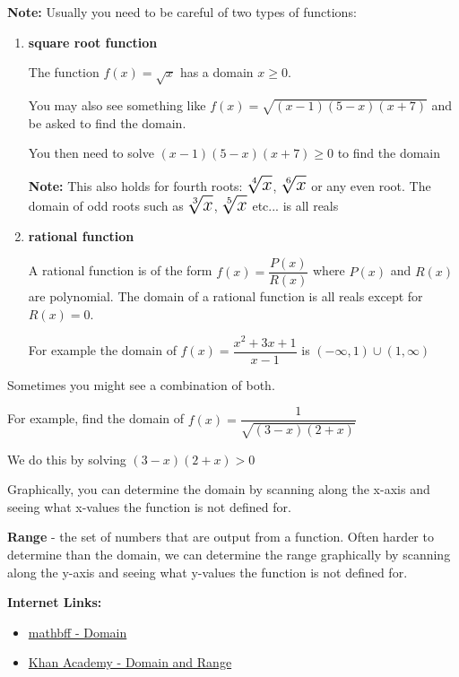 \documentclass[12pt]{article}
\newenvironment{myindentpar}[1]%
     {\begin{list}{}%
             {\setlength{\leftmargin}{#1}}%
             \item[]%
     }
     {\end{list}}
\begin{document}
\begin{myindentpar}{1cm}
\textbf{Note:} Usually you need to be careful of two types of functions: 

\begin{enumerate}
\item \textbf{square root function} 

The function $f(x) = \sqrt{x}$ has a domain $x \geq 0$. 

You may also see something like $f(x) = \sqrt{(x-1)(5-x)(x+7)}$ and be asked to find the domain. 

You then need to solve $(x-1)(5-x)(x+7) \geq 0$ to find the domain

\textbf{Note:} This also holds for fourth roots: $\mathlarger{\mathlarger{\mathlarger{\sqrt[4]{x}}}}$, $\mathlarger{\mathlarger{\mathlarger{\sqrt[6]{x}}}}$ or any even root. The domain of odd roots such as $\mathlarger{\mathlarger{\mathlarger{\sqrt[3]{x}}}}$, $\mathlarger{\mathlarger{\mathlarger{\sqrt[5]{x}}}}$ etc... is all reals
\item \textbf{rational function}

 A rational function is of the form $f(x) = \dfrac{P(x)}{R(x)}$ where $P(x)$ and $R(x)$ are polynomial. The domain of a rational function is all reals except for $R(x)=0.$ 

For example the domain of $f(x) = \dfrac{x^2+3x+1}{x-1}$ is $(-\infty, 1) \cup (1, \infty)$
\end{enumerate}

 Sometimes you might see a combination of both. 

For example, find the domain of $f(x) = \dfrac{1}{\sqrt{(3-x)(2+x)}}$ 

We do this by solving $(3-x)(2+x)>0$
\end{myindentpar}

Graphically, you can determine the domain by scanning along the x-axis and seeing what x-values the function is not defined for.

\textbf{Range} - the set of numbers that are output from a function. Often harder to determine than the domain, we can determine the range graphically by scanning along the y-axis and seeing what y-values the function is not defined for.

\vspace{2cm}

\textbf{Internet Links:}

\begin{itemize}
\item \href{https://www.youtube.com/watch?v=hZEGZMb4uzQ}{mathbff - Domain} 

\item \href{https://www.khanacademy.org/math/algebra/algebra-functions/domain_and_range/v/domain-and-range-1}{Khan Academy - Domain and Range}

\end{itemize}
\end{document}
